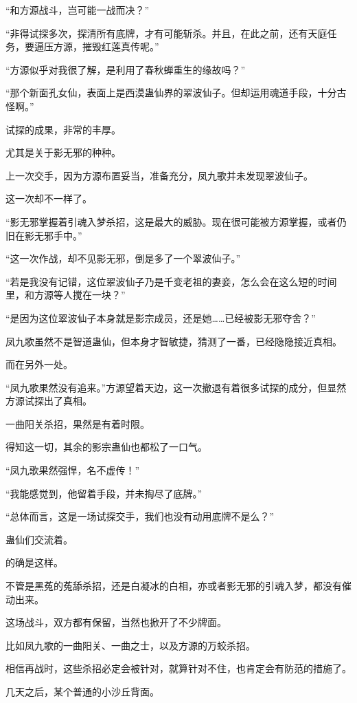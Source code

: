 \begin{this_body}
“和方源战斗，岂可能一战而决？”

“非得试探多次，探清所有底牌，才有可能斩杀。并且，在此之前，还有天庭任务，要逼压方源，摧毁红莲真传呢。”

“方源似乎对我很了解，是利用了春秋蝉重生的缘故吗？”

“那个新面孔女仙，表面上是西漠蛊仙界的翠波仙子。但却运用魂道手段，十分古怪啊。”

试探的成果，非常的丰厚。

尤其是关于影无邪的种种。

上一次交手，因为方源布置妥当，准备充分，凤九歌并未发现翠波仙子。

这一次却不一样了。

“影无邪掌握着引魂入梦杀招，这是最大的威胁。现在很可能被方源掌握，或者仍旧在影无邪手中。”

“这一次作战，却不见影无邪，倒是多了一个翠波仙子。”

“若是我没有记错，这位翠波仙子乃是千变老祖的妻妾，怎么会在这么短的时间里，和方源等人搅在一块？”

“是因为这位翠波仙子本身就是影宗成员，还是她……已经被影无邪夺舍？”

凤九歌虽然不是智道蛊仙，但本身才智敏捷，猜测了一番，已经隐隐接近真相。

而在另外一处。

“凤九歌果然没有追来。”方源望着天边，这一次撤退有着很多试探的成分，但显然方源试探出了真相。

一曲阳关杀招，果然是有着时限。

得知这一切，其余的影宗蛊仙也都松了一口气。

“凤九歌果然强悍，名不虚传！”

“我能感觉到，他留着手段，并未掏尽了底牌。”

“总体而言，这是一场试探交手，我们也没有动用底牌不是么？”

蛊仙们交流着。

的确是这样。

不管是黑菟的菟舔杀招，还是白凝冰的白相，亦或者影无邪的引魂入梦，都没有催动出来。

这场战斗，双方都有保留，当然也掀开了不少牌面。

比如凤九歌的一曲阳关、一曲之士，以及方源的万蛟杀招。

相信再战时，这些杀招必定会被针对，就算针对不住，也肯定会有防范的措施了。

几天之后，某个普通的小沙丘背面。


\end{this_body}
